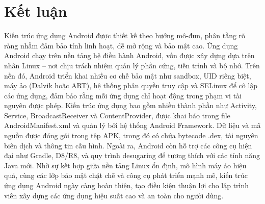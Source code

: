 \section{Kết luận}
    Kiến trúc ứng dụng Android được thiết kế theo hướng mô-đun, phân tầng rõ ràng nhằm đảm bảo tính linh hoạt, dễ mở rộng và bảo mật cao. Ứng dụng Android chạy trên nền tảng hệ điều hành Android, vốn được xây dựng dựa trên nhân Linux – nơi chịu trách nhiệm quản lý phần cứng, tiến trình và bộ nhớ. Trên nền đó, Android triển khai nhiều cơ chế bảo mật như sandbox, UID riêng biệt, máy ảo (Dalvik hoặc ART), hệ thống phân quyền truy cập và SELinux để cô lập các ứng dụng, đảm bảo rằng mỗi ứng dụng chỉ hoạt động trong phạm vi tài nguyên được phép. Kiến trúc ứng dụng bao gồm nhiều thành phần như Activity, Service, BroadcastReceiver và ContentProvider, được khai báo trong file AndroidManifest.xml và quản lý bởi hệ thống Android Framework. Dữ liệu và mã nguồn được đóng gói trong tệp APK, trong đó có chứa bytecode .dex, tài nguyên biên dịch và thông tin cấu hình. Ngoài ra, Android còn hỗ trợ các công cụ hiện đại như Gradle, D8/R8, và quy trình desugaring để tương thích với các tính năng Java mới. Nhờ sự kết hợp giữa nền tảng Linux ổn định, mô hình máy ảo hiệu quả, cùng các lớp bảo mật chặt chẽ và công cụ phát triển mạnh mẽ, kiến trúc ứng dụng Android ngày càng hoàn thiện, tạo điều kiện thuận lợi cho lập trình viên xây dựng các ứng dụng hiệu suất cao và an toàn cho người dùng.\\

